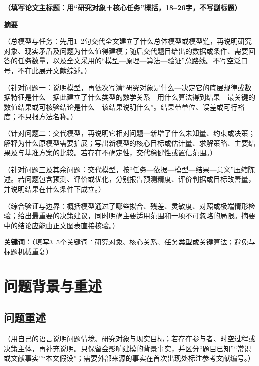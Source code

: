 \documentclass[UTF8,zihao=-4]{ctexart}
\newcommand{\fillin}[1]{（#1）}
\begin{document}
\begin{center}
  {\heiti{}\bfseries
  \fillin{填写论文主标题：用“研究对象＋核心任务”概括，18--26字，不写副标题}}
\end{center}

\begin{center}
  {\heiti{}\bfseries 摘\quad 要}
\end{center}

\fillin{总模型与任务：先用1--2句交代全文建立了什么总体模型或模型链，再说明研究对象、现实矛盾及问题为什么值得建模；随后交代题目给出的数据或条件、需要回答的任务数量，以及全文采用的“模型—原理—算法—验证”总路线。不写空泛口号，不在此展开文献综述。}

\fillin{针对问题一：说明模型，再依次写清“研究对象是什么—决定它的底层规律或数据特征是什么—据此建立了什么类型的数学关系—用什么算法得到结果—最关键的数值结果或可核验结论是什么—该结果说明什么”。结果带单位、误差或可行裕度；不只报方法名称。}

\fillin{针对问题二：交代模型，再说明它相对问题一新增了什么未知量、约束或决策；解释为什么原模型需要扩展；写出新模型的核心目标或估计量、求解策略、主要结果及与基准方案的比较。若存在不确定性，交代稳健性或置信范围。}

\fillin{针对问题三及其余问题：交代模型，按“任务—依据—模型—结果—意义”压缩陈述。若问题包含预测、评价或优化，分别报告预测精度、评价判据或目标改善量，并说明结果在什么条件下成立。}

\fillin{综合验证与边界：概括模型通过了哪些拟合、残差、灵敏度、对照或极端情形检验；给出最重要的决策建议，同时明确主要适用范围和一项不可忽略的局限。摘要中的结论应能由正文图表直接核验。}

\noindent\textbf{关键词：}\fillin{填写3--5个关键词：研究对象、核心关系、任务类型或关键算法；避免与标题机械重复}

\clearpage

\section{问题背景与重述}

\subsection{问题重述}

\fillin{用自己的语言说明问题情境、研究对象与现实目标；若存在参与者、时空过程或决策主体，再补充说明。只保留会影响建模的背景事实，并区分“题目已知”“常识或文献事实”“本文假设”；需要外部来源的事实在首次出现处标注参考文献编号。}
\end{document}
